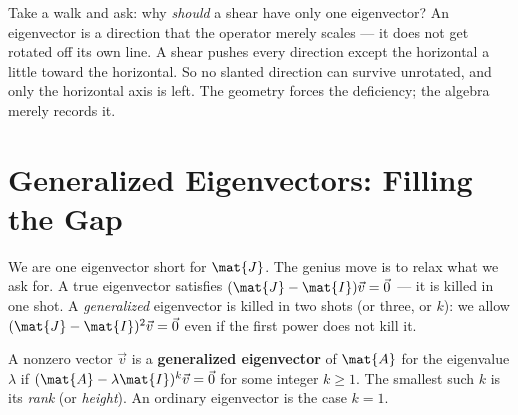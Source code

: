 \begin{walkbox}
Take a walk and ask: why \emph{should} a shear have only one eigenvector? An eigenvector
is a direction that the operator merely scales --- it does not get rotated off its own
line. A shear pushes every direction except the horizontal a little toward the
horizontal. So no slanted direction can survive unrotated, and only the horizontal axis
is left. The geometry forces the deficiency; the algebra merely records it.
\end{walkbox}

\section{Generalized Eigenvectors: Filling the Gap}
\label{ch28:generalized}

We are one eigenvector short for $\mat{J}$. The genius move is to relax what we ask for.
A true eigenvector satisfies $(\mat{J}-\mat{I})\vec{v}=\vec{0}$ --- it is killed in one
shot. A \emph{generalized} eigenvector is killed in two shots (or three, or $k$): we
allow $(\mat{J}-\mat{I})^2\vec{v}=\vec{0}$ even if the first power does not kill it.

\begin{definition}
\label{ch28:def-gen}
A nonzero vector $\vec{v}$ is a \textbf{generalized eigenvector} of $\mat{A}$ for the
eigenvalue $\lambda$ if $(\mat{A}-\lambda\mat{I})^k\vec{v}=\vec{0}$ for some integer
$k\ge 1$. The smallest such $k$ is its \emph{rank} (or \emph{height}). An ordinary
eigenvector is the case $k=1$.
\end{definition}

